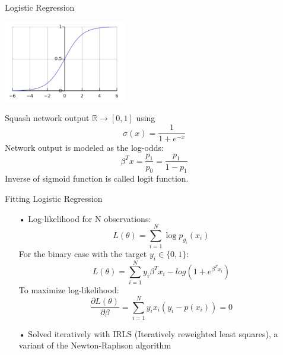 \documentclass{beamer}
\begin{document}
\begin{frame}{Logistic Regression}
\begin{center}
\includegraphics[width=0.4\textwidth]{logistic_function.png}
\end{center}
Squash network output $\mathbb{R}\rightarrow [0,1]$ using
\begin{equation*}
\sigma(x) = \frac{1}{1+e^{-x}}
\end{equation*}
\pause
Network output is modeled as the log-odds:
\begin{equation*}
\beta^T x = \frac{p_1}{p_0} = \frac{p_1}{1-p_1}
\end{equation*}
Inverse of sigmoid function is called logit function.
\end{frame}

\begin{frame}{Fitting Logistic Regression}
\begin{itemize}
\item[•] Log-likelihood for N observations:
\begin{equation*}
L(\theta) = \sum_{i=1}^N \log p_{g_i}(x_i)
\end{equation*}
\pause
For the binary case with the target $y_i \in \{0,1\}$:
\begin{equation*}
L(\theta) = \sum_{i=1}^N y_i \beta^T x_i - log(1+e^{\beta^T x_i})
\end{equation*}
\pause
To maximize log-likelihood:
\begin{equation*}
\frac{\partial L(\theta)}{\partial \beta} = \sum_{i=1}^N y_i x_i(y_i-p(x_i))=0
\end{equation*}
\item[•] Solved iteratively with IRLS (Iteratively reweighted least squares), a variant of the Newton-Raphson algorithm 
\end{itemize}
\end{frame}
\end{document}
